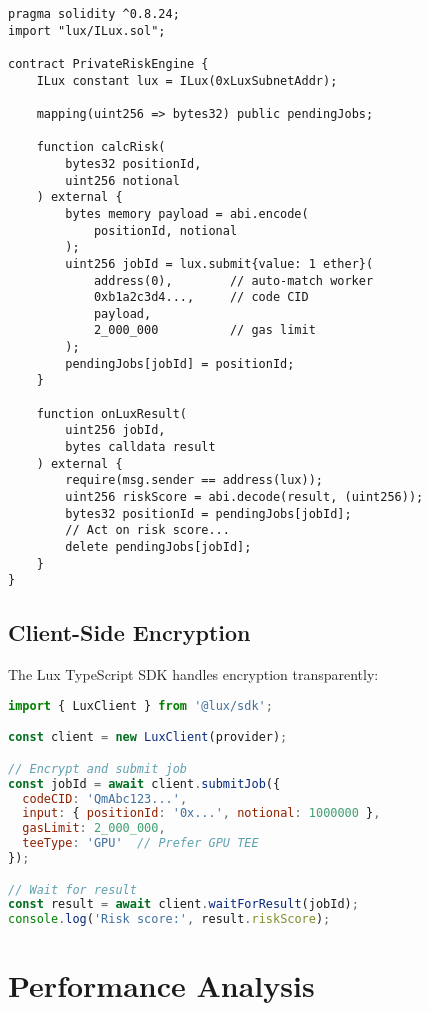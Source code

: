 \documentclass[11pt,letterpaper]{article}
\begin{document}
\begin{lstlisting}[caption={Private Risk Engine Example},label={lst:dev-example}]
pragma solidity ^0.8.24;
import "lux/ILux.sol";

contract PrivateRiskEngine {
    ILux constant lux = ILux(0xLuxSubnetAddr);

    mapping(uint256 => bytes32) public pendingJobs;

    function calcRisk(
        bytes32 positionId,
        uint256 notional
    ) external {
        bytes memory payload = abi.encode(
            positionId, notional
        );
        uint256 jobId = lux.submit{value: 1 ether}(
            address(0),        // auto-match worker
            0xb1a2c3d4...,     // code CID
            payload,
            2_000_000          // gas limit
        );
        pendingJobs[jobId] = positionId;
    }

    function onLuxResult(
        uint256 jobId,
        bytes calldata result
    ) external {
        require(msg.sender == address(lux));
        uint256 riskScore = abi.decode(result, (uint256));
        bytes32 positionId = pendingJobs[jobId];
        // Act on risk score...
        delete pendingJobs[jobId];
    }
}
\end{lstlisting}

\subsection{Client-Side Encryption}

The Lux TypeScript SDK handles encryption transparently:

\begin{lstlisting}[language=JavaScript,caption={TypeScript SDK Usage}]
import { LuxClient } from '@lux/sdk';

const client = new LuxClient(provider);

// Encrypt and submit job
const jobId = await client.submitJob({
  codeCID: 'QmAbc123...',
  input: { positionId: '0x...', notional: 1000000 },
  gasLimit: 2_000_000,
  teeType: 'GPU'  // Prefer GPU TEE
});

// Wait for result
const result = await client.waitForResult(jobId);
console.log('Risk score:', result.riskScore);
\end{lstlisting}

\section{Performance Analysis}
\end{document}
